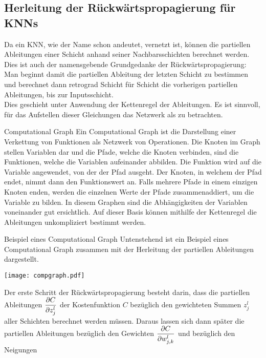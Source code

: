 \begin{appendices}
\chapter{Herleitung der Rückwärtspropagierung für KNNs}\label{sec:anhang_bp}
Da ein KNN, wie der Name schon andeutet, vernetzt ist, können die partiellen
Ableitungen einer Schicht anhand seiner Nachbarsschichten berechnet werden.
Dies ist auch der namensgebende Grundgedanke der Rückwärtspropagierung: Man
beginnt damit die partiellen Ableitung der letzten Schicht zu bestimmen und
berechnet dann retrograd Schicht für Schicht die vorherigen
partiellen Ableitungen, bis zur Inputsschicht. \\
Dies geschieht unter Anwendung der Kettenregel der Ableitungen.
Es ist sinnvoll, für das Aufstellen dieser Gleichungen das Netzwerk als
 zu betrachten.
\para{}
\begin{infobox}{Computational Graph}
  Ein Computational Graph ist die Darstellung einer Verkettung von Funktionen als Netzwerk von Operationen.
  Die Knoten im Graph stellen Variablen dar und die Pfade, welche die Knoten
  verbinden, sind die Funktionen, welche die Variablen aufeinander abbilden. Die
  Funktion wird auf die Variable angewendet, von der der Pfad ausgeht. Der Knoten,
  in welchem der Pfad endet, nimmt dann den Funktionswert an. Falls
  mehrere Pfade in einem einzigen Knoten enden, werden die einzelnen Werte der Pfade
  zusammenaddiert, um die Variable zu bilden. In diesem Graphen sind die
  Abhängigkeiten der Variablen voneinander gut ersichtlich. Auf dieser Basis können mithilfe
  der Kettenregel die Ableitungen unkompliziert bestimmt werden.
\end{infobox}
\para{}
\begin{examplebox}{Beispiel eines Computational Graph}
  Untenstehend ist ein Beispiel eines Computational
  Graph zusammen mit der Herleitung der partiellen Ableitungen dargestellt.
  \para{}
  \begin{center}
    \texttt{[image: compgraph.pdf]}
  \end{center}
\end{examplebox}
\para{}
\pagebreak
Der erste Schritt der Rückwärtspropagierung besteht darin, dass die partiellen Ableitungen $\displaystyle\frac{\partial C}{\partial z_j^l}$
der Kostenfunktion $C$ bezüglich den gewichteten Summen $z_j^l$ aller Schichten
berechnet werden müssen. Daraus lassen sich dann später die partiellen Ableitungen
bezüglich den Gewichten $\displaystyle\frac{\partial C}{\partial w_{j,k}^l}$ und bezüglich den Neigungen

\end{appendices}
